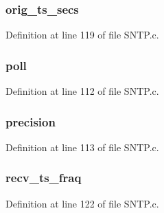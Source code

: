 \subsubsection[{orig\+\_\+ts\+\_\+secs}]{ orig\+\_\+ts\+\_\+secs}\label{struct_n_t_p___p_a_c_k_e_t_add8159fe96173871b82fc34e828bf60c}


Definition at line 119 of file S\+N\+T\+P.\+c.

\hypertarget{struct_n_t_p___p_a_c_k_e_t_a4cef2c03278aceffb246417ececc0a65}{}
\subsubsection[{poll}]{ poll}\label{struct_n_t_p___p_a_c_k_e_t_a4cef2c03278aceffb246417ececc0a65}


Definition at line 112 of file S\+N\+T\+P.\+c.

\hypertarget{struct_n_t_p___p_a_c_k_e_t_a237bc08910aac99166679ade30fba8c2}{}
\subsubsection[{precision}]{ precision}\label{struct_n_t_p___p_a_c_k_e_t_a237bc08910aac99166679ade30fba8c2}


Definition at line 113 of file S\+N\+T\+P.\+c.

\hypertarget{struct_n_t_p___p_a_c_k_e_t_a814b90d8ce72e4a896da29960b9aaad2}{}
\subsubsection[{recv\+\_\+ts\+\_\+fraq}]{ recv\+\_\+ts\+\_\+fraq}\label{struct_n_t_p___p_a_c_k_e_t_a814b90d8ce72e4a896da29960b9aaad2}


Definition at line 122 of file S\+N\+T\+P.\+c.

